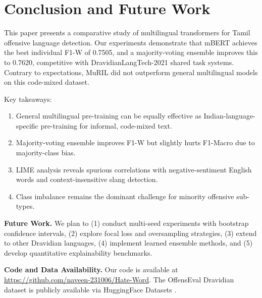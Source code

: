 \documentclass[conference]{IEEEtran}
\begin{document}
\section{Conclusion and Future Work}

This paper presents a comparative study of multilingual transformers for Tamil offensive language detection. Our experiments demonstrate that mBERT achieves the best individual F1-W of 0.7505, and a majority-voting ensemble improves this to 0.7620, competitive with DravidianLangTech-2021 shared task systems. Contrary to expectations, MuRIL did not outperform general multilingual models on this code-mixed dataset.

Key takeaways:
\begin{enumerate}
    \item General multilingual pre-training can be equally effective as Indian-language-specific pre-training for informal, code-mixed text.
    \item Majority-voting ensemble improves F1-W but slightly hurts F1-Macro due to majority-class bias.
    \item LIME analysis reveals spurious correlations with negative-sentiment English words and context-insensitive slang detection.
    \item Class imbalance remains the dominant challenge for minority offensive sub-types.
\end{enumerate}

\textbf{Future Work.} We plan to (1) conduct multi-seed experiments with bootstrap confidence intervals, (2) explore focal loss and oversampling strategies, (3) extend to other Dravidian languages, (4) implement learned ensemble methods, and (5) develop quantitative explainability benchmarks.

\textbf{Code and Data Availability.} Our code is available at \url{https://github.com/naveen-231006/Hate-Word}. The OffensEval Dravidian dataset is publicly available via HuggingFace Datasets \cite{chakravarthi2021dataset}.

\end{document}
